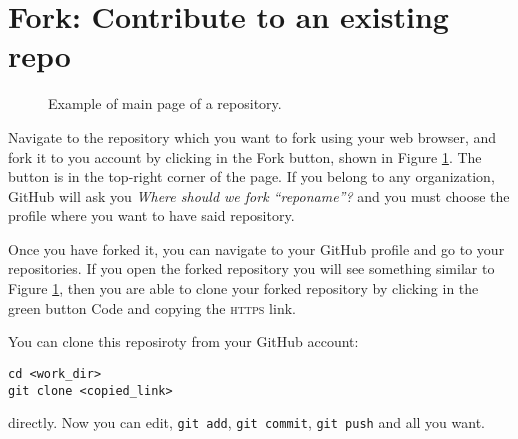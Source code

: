 \section{\textsf{Fork}: Contribute to an existing repo}


\begin{figure} %
    \centering
    \caption{Example of main page of a repository.}
    \label{fig:Fork}
\end{figure}

Navigate to the repository which you want to fork using your web browser, and fork it to you account by clicking in the \textsf{Fork} button, shown in Figure \ref{fig:Fork}. The button is in the top-right corner of the page. If you belong to any organization, \textsf{GitHub} will ask you \textit{Where should we fork ``reponame''?} and you must choose the profile where you want to have said repository.

Once you have forked it, you can navigate to your \textsf{GitHub} profile and go to your repositories. If you open the forked repository you will see something similar to Figure \ref{fig:Fork}, then you are able to clone your forked repository by clicking in the green button \textsf{Code} and copying the \textsc{https} link.

You can clone this reposiroty from your \textsf{GitHub} account:
\begin{lstlisting}[style=shell]
cd <work_dir>
git clone <copied_link>
\end{lstlisting}
directly. Now you can edit, \texttt{git add}, \texttt{git commit}, \texttt{git push} and all you want.


